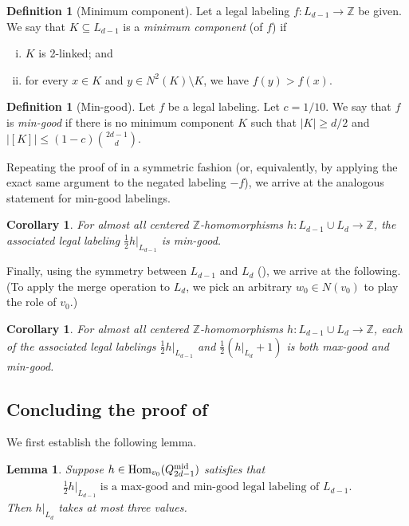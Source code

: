 \documentclass{amsart}
\newtheorem{cor}[thm]{Corollary}
\newtheorem{lem}[thm]{Lemma}
\theoremstyle{definition}
\newtheorem{mydef}[thm]{Definition}
\newcommand{\ZZ}{\mathbb{Z}}
\newcommand{\md}{\mathrm{mid}}
\newcommand{\0}[0]{\emptyset}
\newcommand{\Hom}[0]{\mbox{\rm{Hom}}}
\begin{document}
\begin{mydef}[Minimum component]\label{def:min-component}
Let a legal labeling $f:L_{d-1}\to\ZZ$ be given. We say that $K\subseteq L_{d-1}$ is a \textit{minimum component} (of $f$) if
\begin{enumerate}[(i)]
\item $K$ is 2-linked; and
\item for every $x\in K$ and $y\in N^2(K)\setminus K$, we have $f(y)>f(x)$.
\end{enumerate}
\end{mydef}

\begin{mydef}[Min-good]
Let $f$ be a legal labeling. Let $c=1/10$. We say that $f$ is \textit{min-good} if there is no minimum component $K$ such that $|K|\geq d/2$ and $|[K]|\leq (1-c)\binom{2d-1}{d}$.
\end{mydef}


Repeating the proof of  in a symmetric fashion (or, equivalently, by applying the exact same argument to the negated labeling $-f$), we arrive at the analogous statement for min-good labelings.

\begin{cor}\label{cor:min-good}
For almost all centered $\ZZ$-homomorphisms $h:L_{d-1}\cup L_{d}\to\ZZ$, the associated legal labeling $\frac{1}{2}h|_{L_{d-1}}$ is min-good.
\end{cor}

Finally, using the symmetry between $L_{d-1}$ and $L_d$ (), we arrive at the following. (To apply the merge operation to $L_d$, we pick an arbitrary $w_0 \in N(v_0)$ to play the role of $v_0$.)
\begin{cor}\label{cor:max-min-good}
    For almost all centered $\ZZ$-homomorphisms $h:L_{d-1}\cup L_{d}\to\ZZ$, each of the associated legal labelings $\frac{1}{2}h|_{L_{d-1}}$ and $\frac{1}{2}(h|_{L_{d}}+1)$ is both max-good and min-good.
\end{cor}

\subsection{Concluding the proof of }

 We first establish the following lemma.

\begin{lem}\label{lem:three}
    Suppose $h \in \Hom_{v_0}(Q_{2d-1}^{\md})$ satisfies that
\begin{align}\label{eq:typical-max-min-good}
    \text{$\frac{1}{2}h|_{L_{d-1}}$ is a  max-good and min-good legal labeling of $L_{d-1}$.}
\end{align}
Then $h|_{L_{d}}$ takes at most three values. 
\end{lem}
\end{document}
